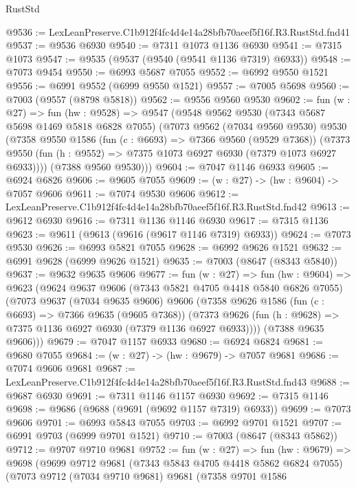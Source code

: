 \begin{lexlean}{RustStd}
\begin{coremodule}
@9536 := LexLeanPreserve.C1b912f4fc4d4e14a28bfb70aeef5f16f.R3.RustStd.fnd41
@9537 := @9536 @6930
@9540 := @7311 @1073 @1136 @6930
@9541 := @7315 @1073
@9547 := @9535 (@9537 (@9540 (@9541 @1136 @7319) @6933))
@9548 := @7073 @9454
@9550 := @6993 @5687 @7055
@9552 := @6992 @9550 @1521
@9556 := @6991 @9552 (@6999 @9550 @1521)
@9557 := @7005 @5698
@9560 := @7003 (@9557 (@8798 @5818))
@9562 := @9556 @9560 @9530
@9602 := fun (w : @27) =>
  fun (hw : @9528) =>
  @9547
    (@9548
      @9562
      @9530
      (@7343 @5687 @5698 @1469 @5818 @6828 @7055)
      (@7073
        @9562
        (@7034 @9560 @9530)
        @9530
        (@7358
          @9550
          @1586
          (fun (c : @6693) => @7366 @9560 (@9529 @7368))
          (@7373 @9550 (fun (h : @9552) => @7375 @1073 @6927 @6930 (@7379 @1073 @6927 @6933))))
        (@7388 @9560 @9530)))
@9604 := @7047 @1146 @6933
@9605 := @6924 @6826
@9606 := @9605 @7055
@9609 := (w : @27) -> (hw : @9604) -> @7057 @9606
@9611 := @7074 @9530 @9606
@9612 := LexLeanPreserve.C1b912f4fc4d4e14a28bfb70aeef5f16f.R3.RustStd.fnd42
@9613 := @9612 @6930
@9616 := @7311 @1136 @1146 @6930
@9617 := @7315 @1136
@9623 := @9611 (@9613 (@9616 (@9617 @1146 @7319) @6933))
@9624 := @7073 @9530
@9626 := @6993 @5821 @7055
@9628 := @6992 @9626 @1521
@9632 := @6991 @9628 (@6999 @9626 @1521)
@9635 := @7003 (@8647 (@8343 @5840))
@9637 := @9632 @9635 @9606
@9677 := fun (w : @27) =>
  fun (hw : @9604) =>
  @9623
    (@9624
      @9637
      @9606
      (@7343 @5821 @4705 @4418 @5840 @6826 @7055)
      (@7073
        @9637
        (@7034 @9635 @9606)
        @9606
        (@7358
          @9626
          @1586
          (fun (c : @6693) => @7366 @9635 (@9605 @7368))
          (@7373 @9626 (fun (h : @9628) => @7375 @1136 @6927 @6930 (@7379 @1136 @6927 @6933))))
        (@7388 @9635 @9606)))
@9679 := @7047 @1157 @6933
@9680 := @6924 @6824
@9681 := @9680 @7055
@9684 := (w : @27) -> (hw : @9679) -> @7057 @9681
@9686 := @7074 @9606 @9681
@9687 := LexLeanPreserve.C1b912f4fc4d4e14a28bfb70aeef5f16f.R3.RustStd.fnd43
@9688 := @9687 @6930
@9691 := @7311 @1146 @1157 @6930
@9692 := @7315 @1146
@9698 := @9686 (@9688 (@9691 (@9692 @1157 @7319) @6933))
@9699 := @7073 @9606
@9701 := @6993 @5843 @7055
@9703 := @6992 @9701 @1521
@9707 := @6991 @9703 (@6999 @9701 @1521)
@9710 := @7003 (@8647 (@8343 @5862))
@9712 := @9707 @9710 @9681
@9752 := fun (w : @27) =>
  fun (hw : @9679) =>
  @9698
    (@9699
      @9712
      @9681
      (@7343 @5843 @4705 @4418 @5862 @6824 @7055)
      (@7073
        @9712
        (@7034 @9710 @9681)
        @9681
        (@7358
          @9701
          @1586

\end{coremodule}
\end{lexlean}
